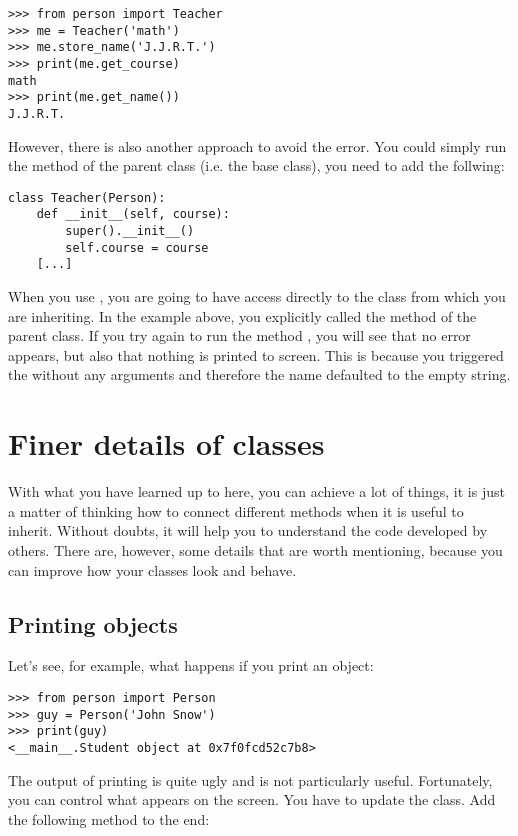 \begin{verbatim}
>>> from person import Teacher
>>> me = Teacher('math')
>>> me.store_name('J.J.R.T.')
>>> print(me.get_course)
math
>>> print(me.get_name())
J.J.R.T.
\end{verbatim}

However, there is also another approach to avoid the error. You could simply run the  method of the parent class (i.e. the base class), you need to add the follwing:

\begin{verbatim}
class Teacher(Person):
    def __init__(self, course):
        super().__init__()
        self.course = course
    [...]
\end{verbatim}

When you use , you are going to have access directly to the class from which you are inheriting. In the example above, you explicitly called the  method of the parent class. If you try again to run the method , you will see that no error appears, but also that nothing is printed to screen. This is because you triggered the  without any arguments and therefore the name defaulted to the empty string. 


\section{Finer details of classes}
With what you have learned up to here, you can achieve a lot of things, it is just a matter of thinking how to connect different methods when it is useful to inherit. Without doubts, it will help you to understand the code developed by others. There are, however, some details that are worth mentioning, because you can improve how your classes look and behave. 

\subsection{Printing objects}
Let's see, for example, what happens if you print an object:
\begin{verbatim}
>>> from person import Person
>>> guy = Person('John Snow')
>>> print(guy)
<__main__.Student object at 0x7f0fcd52c7b8>
\end{verbatim}
The output of printing  is quite ugly and is not particularly useful. Fortunately, you can control what appears on the screen. You have to update the  class. Add the following method to the end:

